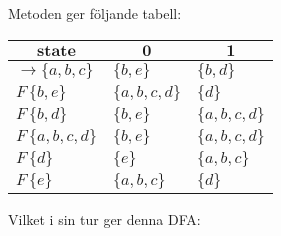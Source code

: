\documentclass{article}
\begin{document}
\section{}

\section{}

Metoden ger följande tabell:
\begin{center}
\begin{tabular}{ |l|l|l| }
\hline
\multicolumn{1}{|c}{$\textbf{state}$}    &  \multicolumn{1}{|c}{$\textbf{0}$}      &  \multicolumn{1}{|c|}{$\textbf{1}$} \\ \hline
$\to \{a, b, c\}$     & $\{b, e\}$        & $\{b, d\}$            \\ \hline
$F\, \{b, e\}$        & $\{a, b, c, d\}$  & $\{d\}$             \\ \hline
$F\, \{b, d\}$        & $\{b, e\}$        & $\{a, b, c, d\}$    \\ \hline
$F\, \{a, b, c, d\}$  & $\{b, e\}$        & $\{a, b, c, d\}$    \\ \hline
$F\, \{d\}$           & $\{e\}$           & $\{a, b, c\}$       \\ \hline
$F\, \{e\}$           & $\{a, b, c\}$     & $\{d\}$             \\ \hline
\end{tabular}
\end{center}

Vilket i sin tur ger denna DFA:


\end{document}
